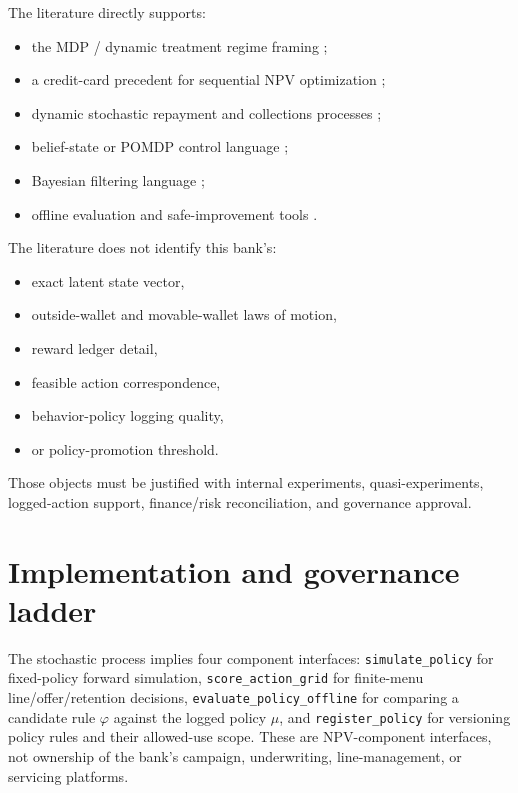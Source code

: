 \documentclass[11pt]{article}
\newcommand{\1}{\mathbf{1}}
\newcommand{\code}[1]{\nolinkurl{#1}}
\theoremstyle{definition}
\begin{document}
The literature directly supports:
\begin{itemize}[leftmargin=*]
  \item the MDP / dynamic treatment regime framing
        \citep{puterman1994mdp,murphy2003dynamic};
  \item a credit-card precedent for sequential NPV optimization
        \citep{trench2003bankone};
  \item dynamic stochastic repayment and collections processes
        \citep{chehrazi2015dynamicvaluation,chehrazi2019collections};
  \item belief-state or POMDP control language
        \citep{smallwood1973pomdp,kaelbling1998pomdp};
  \item Bayesian filtering language
        \citep{durbinkoopman2012ssm,westharrison1997bfdm,doucet2001smc};
  \item offline evaluation and safe-improvement tools
        \citep{dudik2011dr,jiangli2016dr,thomasbrunskill2016ope,
        huwager2021pomdpope,laroche2019spibb,levine2020offline,
        fujimoto2019bcq,kumar2020cql,khraishiokhrati2022offlinecredit}.
\end{itemize}

The literature does not identify this bank's:
\begin{itemize}[leftmargin=*]
  \item exact latent state vector,
  \item outside-wallet and movable-wallet laws of motion,
  \item reward ledger detail,
  \item feasible action correspondence,
  \item behavior-policy logging quality,
  \item or policy-promotion threshold.
\end{itemize}

Those objects must be justified with internal experiments, quasi-experiments,
logged-action support, finance/risk reconciliation, and governance approval.

\section{Implementation and governance ladder}

The stochastic process implies four component interfaces: \code{simulate_policy}
for fixed-policy forward simulation, \code{score_action_grid} for finite-menu
line/offer/retention decisions, \code{evaluate_policy_offline} for comparing a
candidate rule $\varphi$ against the logged policy $\mu$, and
\code{register_policy} for versioning policy rules and their allowed-use scope.
These are NPV-component interfaces, not ownership of the bank's campaign,
underwriting, line-management, or servicing platforms.
\end{document}
